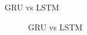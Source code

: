 \begin{vbframe}{GRU vs LSTM}
  \begin{figure}
     \centering
      \caption{\footnotesize{GRU vs LSTM}}
  \end{figure}

\end{vbframe}




